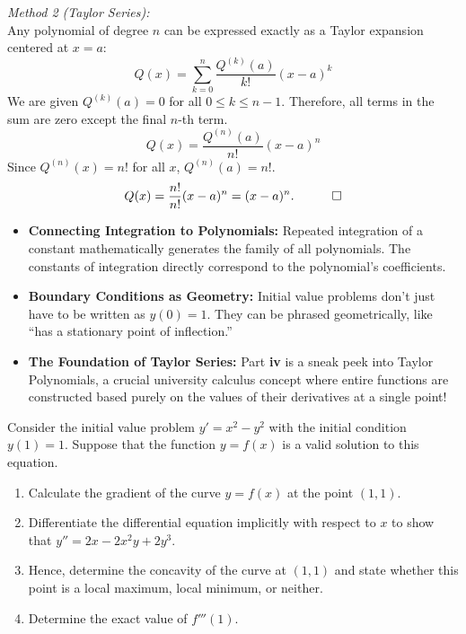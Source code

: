 \begin{solution}
\vspace{0.2cm}
\textit{Method 2 (Taylor Series):} \\
Any polynomial of degree $n$ can be expressed exactly as a Taylor expansion centered at $x=a$:
\[ Q(x) = \sum_{k=0}^{n} \frac{Q^{(k)}(a)}{k!} (x-a)^k \]
We are given $Q^{(k)}(a) = 0$ for all $0 \le k \le n-1$. Therefore, all terms in the sum are zero except the final $n$-th term.
\[ Q(x) = \frac{Q^{(n)}(a)}{n!} (x-a)^n \]
Since $Q^{(n)}(x) = n!$ for all $x$, $Q^{(n)}(a) = n!$.
\[ Q(x) = \frac{n!}{n!} (x-a)^n = (x-a)^n. \quad \qed \]
\end{solution}

\begin{takeaways}
\begin{itemize}[leftmargin=*]
    \item \textbf{Connecting Integration to Polynomials:} Repeated integration of a constant mathematically generates the family of all polynomials. The constants of integration directly correspond to the polynomial's coefficients.
    \item \textbf{Boundary Conditions as Geometry:} Initial value problems don't just have to be written as $y(0)=1$. They can be phrased geometrically, like ``has a stationary point of inflection.''
    \item \textbf{The Foundation of Taylor Series:} Part \textbf{iv} is a sneak peek into Taylor Polynomials, a crucial university calculus concept where entire functions are constructed based purely on the values of their derivatives at a single point!
\end{itemize}
\end{takeaways}

\begin{problem}
Consider the initial value problem $y' = x^2 - y^2$ with the initial condition $y(1) = 1$. Suppose that the function $y = f(x)$ is a valid solution to this equation.

\begin{enumerate}
    \item[\textbf{i}] Calculate the gradient of the curve $y = f(x)$ at the point $(1, 1)$.
    \item[\textbf{ii}] Differentiate the differential equation implicitly with respect to $x$ to show that $y'' = 2x - 2x^2 y + 2y^3$.
    \item[\textbf{iii}] Hence, determine the concavity of the curve at $(1, 1)$ and state whether this point is a local maximum, local minimum, or neither.
    \item[\textbf{iv}] Determine the exact value of $f'''(1)$.
\end{enumerate}
\end{problem}

